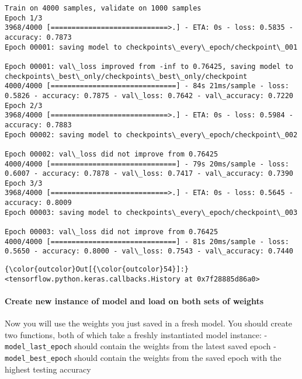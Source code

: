 \documentclass[11pt]{article}
\begin{document}
    \begin{Verbatim}[commandchars=\\\{\}]
Train on 4000 samples, validate on 1000 samples
Epoch 1/3
3968/4000 [============================>.] - ETA: 0s - loss: 0.5835 - accuracy: 0.7873
Epoch 00001: saving model to checkpoints\_every\_epoch/checkpoint\_001

Epoch 00001: val\_loss improved from -inf to 0.76425, saving model to checkpoints\_best\_only/checkpoints\_best\_only/checkpoint
4000/4000 [==============================] - 84s 21ms/sample - loss: 0.5826 - accuracy: 0.7875 - val\_loss: 0.7642 - val\_accuracy: 0.7220
Epoch 2/3
3968/4000 [============================>.] - ETA: 0s - loss: 0.5984 - accuracy: 0.7883
Epoch 00002: saving model to checkpoints\_every\_epoch/checkpoint\_002

Epoch 00002: val\_loss did not improve from 0.76425
4000/4000 [==============================] - 79s 20ms/sample - loss: 0.6007 - accuracy: 0.7878 - val\_loss: 0.7417 - val\_accuracy: 0.7390
Epoch 3/3
3968/4000 [============================>.] - ETA: 0s - loss: 0.5645 - accuracy: 0.8009
Epoch 00003: saving model to checkpoints\_every\_epoch/checkpoint\_003

Epoch 00003: val\_loss did not improve from 0.76425
4000/4000 [==============================] - 81s 20ms/sample - loss: 0.5650 - accuracy: 0.8000 - val\_loss: 0.7543 - val\_accuracy: 0.7440

    \end{Verbatim}

\begin{Verbatim}[commandchars=\\\{\}]
{\color{outcolor}Out[{\color{outcolor}54}]:} <tensorflow.python.keras.callbacks.History at 0x7f28885d86a0>
\end{Verbatim}
            
    \hypertarget{create-new-instance-of-model-and-load-on-both-sets-of-weights}{%
\paragraph{Create new instance of model and load on both sets of
weights}\label{create-new-instance-of-model-and-load-on-both-sets-of-weights}}

Now you will use the weights you just saved in a fresh model. You should
create two functions, both of which take a freshly instantiated model
instance: - \texttt{model\_last\_epoch} should contain the weights from
the latest saved epoch - \texttt{model\_best\_epoch} should contain the
weights from the saved epoch with the highest testing accuracy
\end{document}
